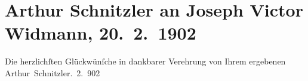 

         
         \renewcommand{\erwaehntePersonen}{Personen: Joseph Victor Widmann}
         \renewcommand{\erwaehnteOrte}{Orte: Bern, Wien}
         \renewcommand{\erwaehnteWerke}{}
               \section[Arthur Schnitzler an Joseph Victor Widmann, 20. 2. 1902]{ Arthur Schnitzler an Joseph Victor Widmann, 20. 2. 1902}\nopagebreak{}\rehead{ }\begin{ledgroupsized}[t]{13cm}\normalsize\beginnumbering{} \toendnotes[C]{\smallbreak\pagebreak[2]} 
\pstart
           \noindent{}{\pb}Die herzlichſten Glückwünſche in dankbarer
               Verehrung von Ihrem ergebenen\pend
           \pstart \spacefill\mbox{Arthur Schnitzler}\pend{}. 2. 902\pend
           
         
         \endnumbering{}\end{ledgroupsized}  \newcommand{\dateiname}{L01204}\newcommand{\titel}{Arthur Schnitzler an Joseph Victor Widmann, 20. 2. 1902}\newcommand{\editorInnen}{Martin Anton Müller und Gerd-Hermann Susen}
      